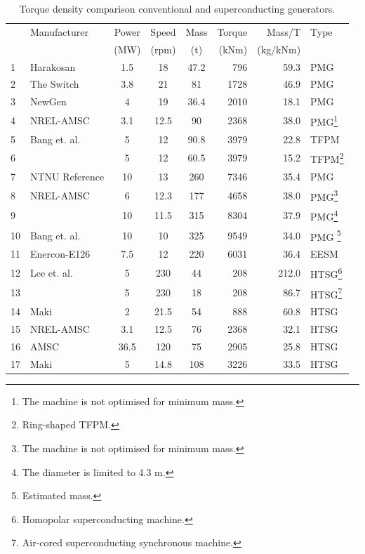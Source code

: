 \documentclass[12pt]{iopart}
\begin{document}
\begin{table}[]
\begin{minipage}{\textwidth}
\caption{Torque density comparison conventional and superconducting generators.}
\label{generators_list}
\centering
\begin{tabular}{llcccrrl}
\hline
 & Manufacturer & Power & Speed & Mass & Torque & Mass/T & Type \\
&  & (MW) & (rpm) & (t) & (kNm) & (kg/kNm) & \\
\hline
1 & Harakosan \cite{Duan2009}& 1.5 & 18 & 47.2 & 796 & 59.3 & PMG \\
2 & The Switch \cite{Duan2009} & 3.8 & 21 & 81 & 1728 & 46.9 & PMG  \\
3 & NewGen \cite{Engstrom2004} & 4 & 19 & 36.4 & 2010 & 18.1 & PMG  \\
4 & NREL-AMSC \cite{Maples2010}& 3.1 & 12.5 & 90 & 2368 & 38.0 & PMG\footnote{The machine is not optimised for minimum mass.}  \\ 
5 & Bang et. al. \cite{Bang2009} & 5 & 12 & 90.8 & 3979 & 22.8 & TFPM  \\
6 &  & 5 & 12 & 60.5 & 3979 & 15.2 & TFPM\footnote{Ring-shaped TFPM.}  \\
7 & NTNU Reference \cite{Smith2012} & 10 & 13 & 260 & 7346 & 35.4 & PMG \\
8 & NREL-AMSC \cite{Maples2010} & 6 & 12.3 & 177 & 4658 & 38.0 &  PMG\footnote{The machine is not optimised for minimum mass.} \\
9 &  & 10 & 11.5 & 315 & 8304 & 37.9 & PMG\footnote{The diameter is limited to 4.3 m.}  \\
10 & Bang et. al. \cite{Bang2008} & 10 & 10 & 325 & 9549 & 34.0 & PMG \footnote{Estimated mass.}  \\
11 & Enercon-E126 & 7.5 & 12 & 220 & 6031 & 36.4 & EESM \\
12 & Lee et. al. \cite{Lee2008} & 5 & 230 & 44 & 208 & 212.0 & HTSG\footnote{Homopolar superconducting machine.}  \\
13 &  & 5 & 230 & 18 & 208 & 86.7 &  HTSG\footnote{Air-cored superconducting synchronous machine.} \\
14 &  Maki \cite{Maki2008} & 2 & 21.5 & 54 & 888 & 60.8 & HTSG  \\
15 & NREL-AMSC \cite{Maples2010} & 3.1 & 12.5 & 76 & 2368 & 32.1 & HTSG  \\
16 & AMSC \cite{Kalsi2006} & 36.5 & 120 & 75 & 2905 & 25.8 & HTSG \\
17 & Maki \cite{Maki2008} & 5 & 14.8 & 108 & 3226 & 33.5 & HTSG \\

\end{tabular}
\end{minipage}
\end{table}
\end{document}
